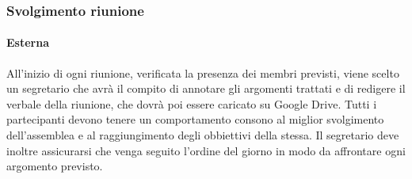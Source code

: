 \documentclass[../NormeDiProgetto.tex]{subfiles}
\begin{document}
				\subsubsection{Svolgimento riunione}
					\paragraph{Esterna\\}
						All'inizio di ogni riunione, verificata la presenza dei membri previsti, viene scelto
						un segretario che avrà il compito di annotare gli argomenti trattati e di redigere
						il verbale della riunione, che dovrà poi essere caricato su Google Drive. 
						Tutti i partecipanti devono tenere un comportamento consono al miglior svolgimento
						dell'assemblea e al raggiungimento degli obbiettivi della stessa.
						Il segretario deve inoltre assicurarsi che venga seguito l'ordine del giorno
						in modo da affrontare ogni argomento previsto.
\end{document}
